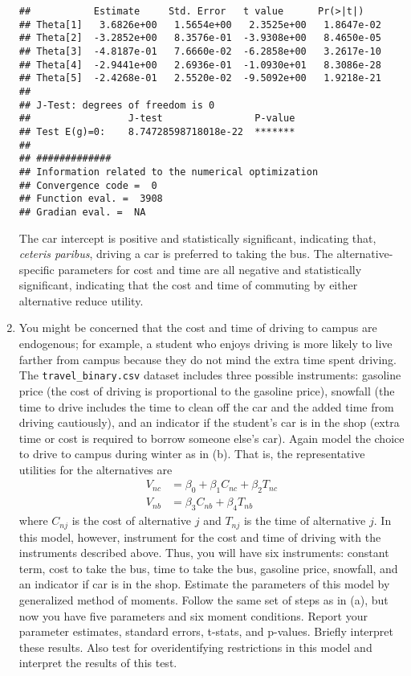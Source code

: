 \documentclass[11pt,letterpaper]{article}\usepackage[]{graphicx}\usepackage[]{color}
\makeatletter
\newenvironment{kframe}{%
 \def\at@end@of@kframe{}%
 \ifinner\ifhmode%
  \def\at@end@of@kframe{\end{minipage}}%
  \begin{minipage}{\columnwidth}%
 \fi\fi%
 \def\FrameCommand##1{\hskip\@totalleftmargin \hskip-\fboxsep
 \colorbox{shadecolor}{##1}\hskip-\fboxsep
     \hskip-\linewidth \hskip-\@totalleftmargin \hskip\columnwidth}%
 \MakeFramed {\advance\hsize-\width
   \@totalleftmargin\z@ \linewidth\hsize
   \@setminipage}}%
 {\par\unskip\endMakeFramed%
 \at@end@of@kframe}
\newenvironment{knitrout}{}{} %
\makeatother
\begin{document}
\begin{enumerate}[label=\alph*., leftmargin=*]
\begin{knitrout}
\begin{kframe}
\begin{verbatim}
##           Estimate     Std. Error   t value      Pr(>|t|)   
## Theta[1]   3.6826e+00   1.5654e+00   2.3525e+00   1.8647e-02
## Theta[2]  -3.2852e+00   8.3576e-01  -3.9308e+00   8.4650e-05
## Theta[3]  -4.8187e-01   7.6660e-02  -6.2858e+00   3.2617e-10
## Theta[4]  -2.9441e+00   2.6936e-01  -1.0930e+01   8.3086e-28
## Theta[5]  -2.4268e-01   2.5520e-02  -9.5092e+00   1.9218e-21
## 
## J-Test: degrees of freedom is 0 
##                 J-test                P-value             
## Test E(g)=0:    8.74728598718018e-22  *******             
## 
## #############
## Information related to the numerical optimization
## Convergence code =  0 
## Function eval. =  3908 
## Gradian eval. =  NA
\end{verbatim}
\end{kframe}
\end{knitrout}

	The car intercept is positive and statistically significant, indicating that, \emph{ceteris paribus}, driving a car is preferred to taking the bus. The alternative-specific parameters for cost and time are all negative and statistically significant, indicating that the cost and time of commuting by either alternative reduce utility.

	\item You might be concerned that the cost and time of driving to campus are endogenous; for example, a student who enjoys driving is more likely to live farther from campus because they do not mind the extra time spent driving. The \texttt{travel\_binary.csv} dataset includes three possible instruments: gasoline price (the cost of driving is proportional to the gasoline price), snowfall (the time to drive includes the time to clean off the car and the added time from driving cautiously), and an indicator if the student's car is in the shop (extra time or cost is required to borrow someone else's car). Again model the choice to drive to campus during winter as in (b). That is, the representative utilities for the alternatives are
	\begin{align*}
		V_{nc} &= \beta_0 + \beta_1 C_{nc} + \beta_2 T_{nc} \\
		V_{nb} &= \beta_3 C_{nb} + \beta_4 T_{nb}
	\end{align*}
	where $C_{nj}$ is the cost of alternative $j$ and $T_{nj}$ is the time of alternative $j$. In this model, however, instrument for the cost and time of driving with the instruments described above. Thus, you will have six instruments: constant term, cost to take the bus, time to take the bus, gasoline price, snowfall, and an indicator if car is in the shop. Estimate the parameters of this model by generalized method of moments. Follow the same set of steps as in (a), but now you have five parameters and six moment conditions. Report your parameter estimates, standard errors, t-stats, and p-values. Briefly interpret these results. Also test for overidentifying restrictions in this model and interpret the results of this test.


\end{enumerate}
\end{document}
